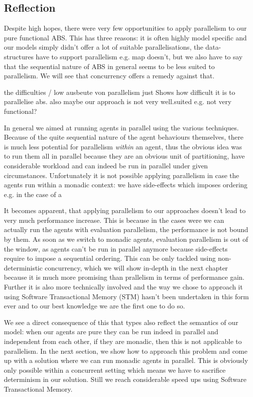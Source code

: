 \subsection{Reflection}
Despite high hopes, there were very few opportunities to apply parallelism to our pure functional ABS. This has three reasons: it is often highly model specific and our models simply didn't offer a lot of suitable parallelisations, the data-structures have to support parallelism e.g. map doesn't, but we also have to say that the sequential nature of ABS in general seems to be less suited to parallelism. We will see that concurrency offers a remedy against that.

the difficulties / low ausbeute von parallelism just Shows how difficult it is to parallelise abs. also maybe our approach is not very well.suited e.g. not very functional?

In general we aimed at running agents in parallel using the various techniques. Because of the quite sequential nature of the agent behaviours themselves, there is much less potential for parallelism \textit{within} an agent, thus the obvious idea was to run them all in parallel because they are an obvious unit of partitioning, have considerable workload and can indeed be run in parallel under given circumstances.
Unfortunately it is not possible applying parallelism in case the agents run within a monadic context: we have side-effects which imposes ordering e.g. in the case of a

It becomes apparent, that applying parallelism to our approaches doesn't lead to very much performance increase. This is because in the cases were we can actually run the agents with evaluation parallelism, the performance is not bound by them. As soon as we switch to monadic agents, evaluation parallelism is out of the window, as agents can't be run in parallel anymore because side-effects require to impose a sequential ordering. This can be only tackled using non-deterministic concurrency, which we will show in-depth in the next chapter because it is much more promising than prallelism in terms of performance gain. Further it is also more technically involved and the way we chose to approach it using Software Transactional Memory (STM) hasn't been undertaken in this form ever and to our best knowledge we are the first one to do so.

We see a direct consequence of this that types also reflect the semantics of our model: when our agents are pure they can be run indeed in parallel and independent from each other, if they are monadic, then this is not applicable to parallelism. In the next section, we show how to approach this problem and come up with a solution where we can run monadic agents in parallel. This is obviously only possible within a concurrent setting which means we have to sacrifice determinism in our solution. Still we reach considerable speed ups using Software Transactional Memory.